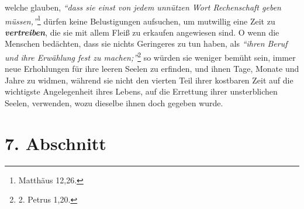 welche glauben,
\textit{"`dass sie einst von jedem unnützen Wort Rechenschaft geben
müssen,"'}\footnote{Matthäus 12,26.}
dürfen keine Belustigungen aufsuchen, um
mutwillig eine Zeit zu \textbf{\textit{vertreiben}}, die sie mit allem Fleiß zu
erkaufen
angewiesen sind. O wenn die Menschen bedächten, dass sie nichts Geringeres zu
tun haben, als
\textit{"`ihren Beruf und ihre Erwählung fest zu machen;"'}\footnote{2. Petrus
1,20.}
so würden sie weniger bemüht sein, immer neue Erhohlungen für ihre
leeren Seelen zu erfinden, und ihnen Tage, Monate und Jahre zu widmen, während
sie nicht den vierten Teil ihrer kostbaren Zeit auf die wichtigste
Angelegenheit ihres Lebens, auf die Errettung ihrer unsterblichen Seelen,
verwenden, wozu dieselbe ihnen doch gegeben wurde.

\section{7. Abschnitt} \label{kap15_ab7}

